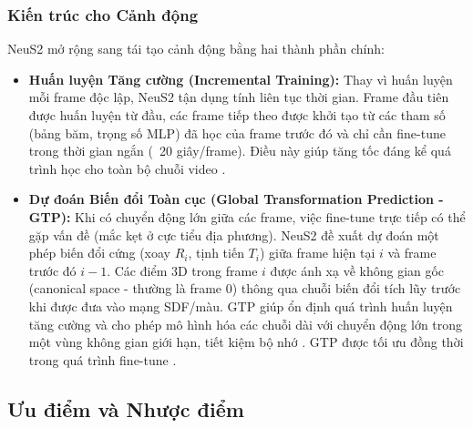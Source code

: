 \subsubsection{Kiến trúc cho Cảnh động}
NeuS2 mở rộng sang tái tạo cảnh động bằng hai thành phần chính:
\begin{itemize}
    \item \textbf{Huấn luyện Tăng cường (Incremental Training):} Thay vì huấn luyện mỗi frame độc lập, NeuS2 tận dụng tính liên tục thời gian. Frame đầu tiên được huấn luyện từ đầu, các frame tiếp theo được khởi tạo từ các tham số (bảng băm, trọng số MLP) đã học của frame trước đó và chỉ cần fine-tune trong thời gian ngắn (~20 giây/frame). Điều này giúp tăng tốc đáng kể quá trình học cho toàn bộ chuỗi video \cite{Wang2023NeuS2_source_6, Wang2023NeuS2_source_28, Wang2023NeuS2_source_103, Wang2023NeuS2_source_140, Wang2023NeuS2_source_142, Wang2023NeuS2_source_143}.
    \item \textbf{Dự đoán Biến đổi Toàn cục (Global Transformation Prediction - GTP):} Khi có chuyển động lớn giữa các frame, việc fine-tune trực tiếp có thể gặp vấn đề (mắc kẹt ở cực tiểu địa phương). NeuS2 đề xuất dự đoán một phép biến đổi cứng (xoay $R_i$, tịnh tiến $T_i$) giữa frame hiện tại $i$ và frame trước đó $i-1$. Các điểm 3D trong frame $i$ được ánh xạ về không gian gốc (canonical space - thường là frame 0) thông qua chuỗi biến đổi tích lũy trước khi được đưa vào mạng SDF/màu. GTP giúp ổn định quá trình huấn luyện tăng cường và cho phép mô hình hóa các chuỗi dài với chuyển động lớn trong một vùng không gian giới hạn, tiết kiệm bộ nhớ \cite{Wang2023NeuS2_source_6, Wang2023NeuS2_source_30, Wang2023NeuS2_source_34, Wang2023NeuS2_source_90, Wang2023NeuS2_source_104, Wang2023NeuS2_source_145, Wang2023NeuS2_source_146, Wang2023NeuS2_source_148, Wang2023NeuS2_source_150, Wang2023NeuS2_source_151, Wang2023NeuS2_source_152}. GTP được tối ưu đồng thời trong quá trình fine-tune \cite{Wang2023NeuS2_source_163}.
\end{itemize}

\subsection{Ưu điểm và Nhược điểm}

